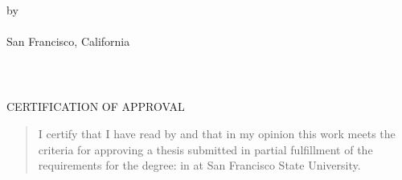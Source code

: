 \documentclass[12pt,oneside]{sfsuthesis}
\theoremstyle{plain} %
\theoremstyle{definition}  %
\theoremstyle{remark}  %
\theoremstyle{plain}
\begin{document}
\thispagestyle{empty}

\[ \]
\vspace{-1.9in}

\begin{center}
{\mytitle}

\vspace{1.4in}


\vspace{.5in}


\vspace{3.1in}

{by \\[12pt] 
\myname \\[12pt]
San Francisco, California\\[12pt]
\thismonth
\thisyear}
\end{center}

\newpage
\textheight=7.1in    %
\footskip=1.1in      %
\thispagestyle{empty}

$\mbox{}$
\vspace{3in}
\begin{center}
\end{center}

\newpage
\thispagestyle{empty}
\[ \]
\vspace{-1.8in}
\begin{center}
{CERTIFICATION OF APPROVAL}
\end{center}
\vspace{.6in}
\begin{quote}
I certify that I have read {\it \mytitle} by \myname and that in my opinion this work meets the criteria for approving a thesis submitted in partial fulfillment of the requirements
for the degree: \mydegree in \myfield at San Francisco State University.
\end{quote}
\end{document}
